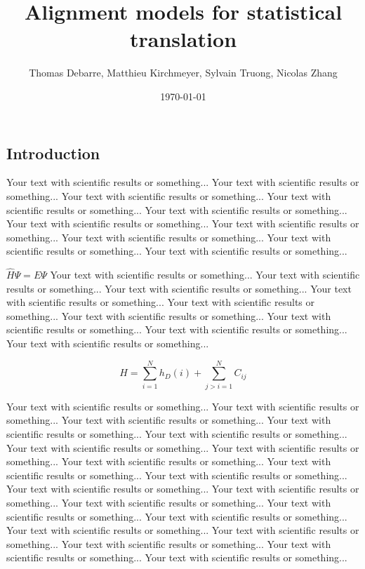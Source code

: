 \documentclass[final]{beamer}
\title
[Probabilistic Graphical Models Poster Session, Wed 4 Jan 2017] %
{ %
Alignment models for statistical translation
}
\author{ %
Thomas Debarre, Matthieu Kirchmeyer, Sylvain Truong, Nicolas Zhang
}
\institute
{\mbox{}
}
\date{\today}
\begin{document}
\begin{frame}[t]
\begin{multicols}{3}

\section{Introduction}

Your text with scientific results or something... 
Your text with scientific results or something... 
Your text with scientific results or something... 
Your text with scientific results or something... 
Your text with scientific results or something... 
Your text with scientific results or something... 
Your text with scientific results or something... 
Your text with scientific results or something... 
Your text with scientific results or something... 
Your text with scientific results or something... 

 $\hat H \Psi = E \Psi$  
Your text with scientific results or something... 
Your text with scientific results or something... 
Your text with scientific results or something... 
Your text with scientific results or something... 
Your text with scientific results or something... 
Your text with scientific results or something... 
Your text with scientific results or something... 
Your text with scientific results or something... 
Your text with scientific results or something...

\begin{equation}
H = \sum_{i=1}^{N} h_{D}(i) + \sum_{j>i=1}^{N} C_{ij}
\end{equation}

Your text with scientific results or something... 
Your text with scientific results or something... 
Your text with scientific results or something... 
Your text with scientific results or something... 
Your text with scientific results or something... 
Your text with scientific results or something... 
Your text with scientific results or something... 
Your text with scientific results or something... 
Your text with scientific results or something... 
Your text with scientific results or something... 
Your text with scientific results or something... 
Your text with scientific results or something... 
Your text with scientific results or something... 
Your text with scientific results or something... 
Your text with scientific results or something... 
Your text with scientific results or something... 
Your text with scientific results or something... 
Your text with scientific results or something... 
Your text with scientific results or something... 
Your text with scientific results or something...


\end{multicols}
\end{frame}
\end{document}
